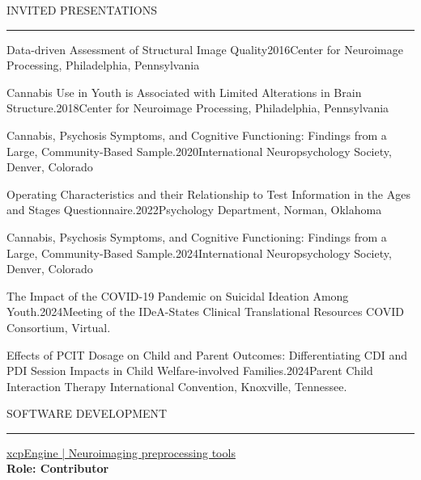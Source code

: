 \documentclass{resume} %
\renewenvironment{rSection}[1]{
\sectionskip
\textcolor{CarnegieMellonRed}{\MakeUppercase{#1}}
\sectionlineskip
\hrule
\begin{list}{}{
\setlength{\leftmargin}{1.5em}
}
\item[]
}{
\end{list}
}
\begin{document}
\begin{rSection}{Invited Presentations}
\begin{rSubsectionPres}{Data-driven Assessment of Structural Image Quality}{2016}{Center for Neuroimage Processing, Philadelphia, Pennsylvania} 
\end{rSubsectionPres}
\begin{rSubsectionPres}{Cannabis Use in Youth is Associated with Limited Alterations in Brain Structure.}{2018}{Center for Neuroimage Processing, Philadelphia, Pennsylvania} 
\end{rSubsectionPres}
\begin{rSubsectionPres}{Cannabis, Psychosis Symptoms, and Cognitive Functioning: Findings from a Large, Community-Based Sample.}{2020}{International Neuropsychology Society, Denver, Colorado} 
\end{rSubsectionPres}
\begin{rSubsectionPres}{Operating Characteristics and their Relationship to Test Information in the Ages and Stages Questionnaire.}{2022}{Psychology Department, Norman, Oklahoma} 
\end{rSubsectionPres}\begin{rSubsectionPres}{Cannabis, Psychosis Symptoms, and Cognitive Functioning: Findings from a Large, Community-Based Sample.}{2024}{International Neuropsychology Society, Denver, Colorado} 
\end{rSubsectionPres}
\begin{rSubsectionPres}{The Impact of the COVID-19 Pandemic on Suicidal Ideation Among Youth.}{2024}{Meeting of the IDeA-States Clinical Translational Resources COVID Consortium,  Virtual.} 
\end{rSubsectionPres}
\begin{rSubsectionPres}{Effects of PCIT Dosage on Child and Parent Outcomes: Differentiating CDI and PDI Session Impacts in Child Welfare-involved Families.}{2024}{Parent Child Interaction Therapy International Convention, Knoxville, Tennessee.} 
\end{rSubsectionPres}
\end{rSection}

\begin{rSection}{Software Development} \itemsep -2pt
{\href{https://github.com/PennLINC/xcpEngine}{xcpEngine | Neuroimaging preprocessing tools}}\\
{\bf{ \small{Role:}} Contributor}
\end{rSection}
\end{document}
